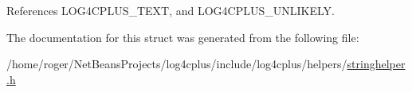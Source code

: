 References L\-O\-G4\-C\-P\-L\-U\-S\-\_\-\-T\-E\-X\-T, and L\-O\-G4\-C\-P\-L\-U\-S\-\_\-\-U\-N\-L\-I\-K\-E\-L\-Y.



The documentation for this struct was generated from the following file\-:\begin{DoxyCompactItemize}
\item 
/home/roger/\-Net\-Beans\-Projects/log4cplus/include/log4cplus/helpers/\hyperlink{stringhelper_8h}{stringhelper.\-h}\end{DoxyCompactItemize}
